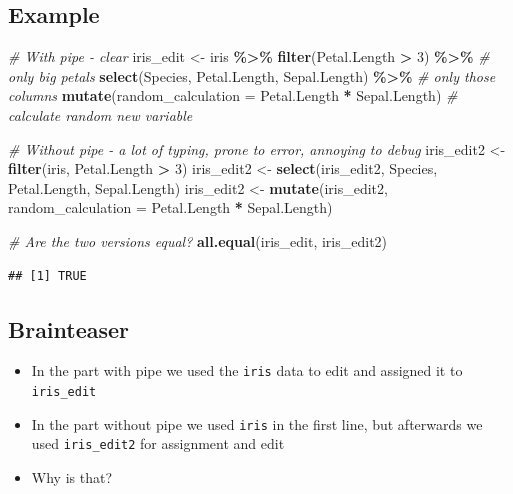 \documentclass[
]{book}
\newenvironment{Shaded}{\begin{snugshade}}{\end{snugshade}}
\newcommand{\AttributeTok}[1]{\textcolor[rgb]{0.13,0.29,0.53}{#1}}
\newcommand{\CommentTok}[1]{\textcolor[rgb]{0.56,0.35,0.01}{\textit{#1}}}
\newcommand{\DecValTok}[1]{\textcolor[rgb]{0.00,0.00,0.81}{#1}}
\newcommand{\FunctionTok}[1]{\textcolor[rgb]{0.13,0.29,0.53}{\textbf{#1}}}
\newcommand{\NormalTok}[1]{#1}
\newcommand{\OtherTok}[1]{\textcolor[rgb]{0.56,0.35,0.01}{#1}}
\newcommand{\SpecialCharTok}[1]{\textcolor[rgb]{0.81,0.36,0.00}{\textbf{#1}}}
\begin{document}
\subsection{Example}\label{example}

\begin{Shaded}
\begin{Highlighting}[]
\CommentTok{\# With pipe {-} clear}
\NormalTok{iris\_edit }\OtherTok{\textless{}{-}}\NormalTok{ iris }\SpecialCharTok{\%\textgreater{}\%}
 \FunctionTok{filter}\NormalTok{(Petal.Length }\SpecialCharTok{\textgreater{}} \DecValTok{3}\NormalTok{) }\SpecialCharTok{\%\textgreater{}\%} \CommentTok{\# only big petals}
 \FunctionTok{select}\NormalTok{(Species, Petal.Length, Sepal.Length) }\SpecialCharTok{\%\textgreater{}\%}  \CommentTok{\# only those columns}
 \FunctionTok{mutate}\NormalTok{(}\AttributeTok{random\_calculation =}\NormalTok{ Petal.Length }\SpecialCharTok{*}\NormalTok{ Sepal.Length) }\CommentTok{\# calculate random new variable}

\CommentTok{\# Without pipe {-} a lot of typing, prone to error, annoying to debug}
\NormalTok{iris\_edit2 }\OtherTok{\textless{}{-}} \FunctionTok{filter}\NormalTok{(iris, Petal.Length }\SpecialCharTok{\textgreater{}} \DecValTok{3}\NormalTok{)}
\NormalTok{iris\_edit2 }\OtherTok{\textless{}{-}} \FunctionTok{select}\NormalTok{(iris\_edit2, Species, Petal.Length, Sepal.Length)}
\NormalTok{iris\_edit2 }\OtherTok{\textless{}{-}} \FunctionTok{mutate}\NormalTok{(iris\_edit2, }\AttributeTok{random\_calculation =}\NormalTok{ Petal.Length }\SpecialCharTok{*}\NormalTok{ Sepal.Length)}

\CommentTok{\# Are the two versions equal?}
\FunctionTok{all.equal}\NormalTok{(iris\_edit, iris\_edit2)}
\end{Highlighting}
\end{Shaded}

\begin{verbatim}
## [1] TRUE
\end{verbatim}

\subsection{\texorpdfstring{Brainteaser }{Brainteaser }}\label{brainteaser-1}

\begin{itemize}
\item
  In the part with pipe we used the \texttt{iris} data to edit and assigned it to \texttt{iris\_edit}
\item
  In the part without pipe we used \texttt{iris} in the first line, but afterwards we used \texttt{iris\_edit2} for assignment and edit
\item
  Why is that?
\end{itemize}
\end{document}
